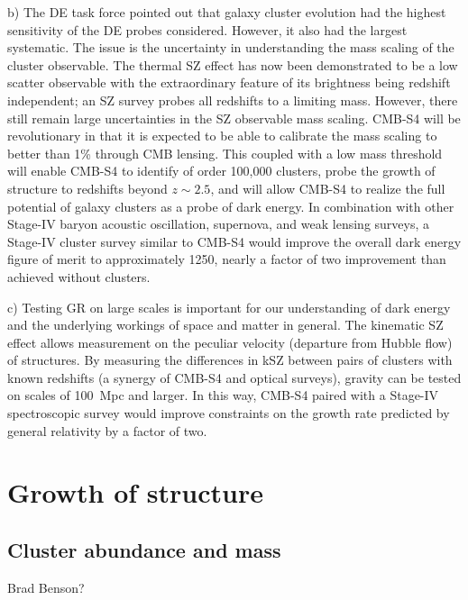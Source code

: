 \documentclass[11pt]{article}
\begin{document}
 b) The DE task force pointed out that galaxy cluster evolution had the highest 
 sensitivity of the DE probes considered. However, it also had the largest systematic. The issue is the uncertainty in understanding the mass scaling of the cluster observable. The thermal SZ effect has now been demonstrated to be a low scatter observable  with the extraordinary feature of its brightness being redshift independent; an SZ survey probes all redshifts to a limiting mass. However, there still remain large uncertainties in the SZ observable mass scaling. CMB-S4 will be revolutionary in that it is expected to be able to calibrate the mass scaling to better than 1\% through CMB lensing. This coupled with a low mass threshold will enable CMB-S4 to identify of order 100,000 clusters, probe the growth of structure to redshifts beyond $z \sim 2.5$, and will allow CMB-S4 to realize the full potential of galaxy clusters as a probe of dark energy.  In combination with other Stage-IV baryon acoustic oscillation, supernova, and weak lensing surveys, a Stage-IV cluster survey similar to CMB-S4 would improve the overall dark energy figure of merit to approximately 1250, nearly a factor of two improvement than achieved without clusters. 

 c) Testing GR on large scales is important for our understanding of dark energy and the underlying workings of space and matter in general.  The kinematic SZ effect allows measurement on the peculiar velocity (departure from Hubble flow) of structures. By measuring the differences in kSZ between pairs of clusters with known redshifts (a synergy of CMB-S4 and optical surveys), gravity can be tested on scales of 100~Mpc and larger. In this way, CMB-S4 paired with a Stage-IV spectroscopic survey would improve constraints on the growth rate predicted by general relativity by a factor of two.
 
 
\section{Growth of structure}

\subsection{Cluster abundance and mass}

Brad Benson?
\end{document}
